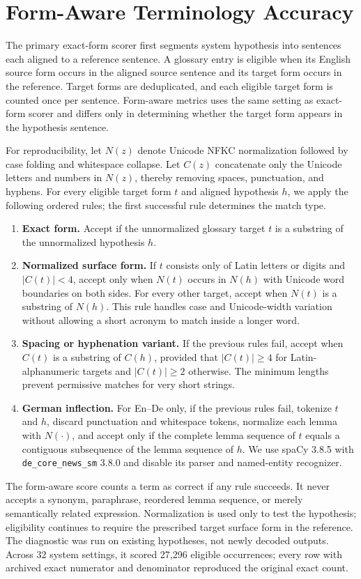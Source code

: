 \section{\texorpdfstring{Form-Aware Terminology Accuracy}{Form-Aware Terminology Accuracy}}
\label{app:form_aware_metric}


The primary exact-form scorer first segments system hypothesis into sentences each aligned to a reference sentence. A glossary entry is eligible when its English source form occurs in the aligned source sentence and its target form occurs in the reference. Target forms are deduplicated, and each eligible target form is counted once per sentence. Form-aware metrics uses the same setting as exact-form scorer and differs only in determining whether the target form appears in the hypothesis sentence.

For reproducibility, let $N(z)$ denote Unicode NFKC normalization followed by case folding and whitespace collapse. Let $C(z)$ concatenate only the Unicode letters and numbers in $N(z)$, thereby removing spaces, punctuation, and hyphens. For every eligible target form $t$ and aligned hypothesis $h$, we apply the following ordered rules; the first successful rule determines the match type.
\begin{enumerate}[leftmargin=*,nosep]
    \item \textbf{Exact form.} Accept if the unnormalized glossary target $t$ is a substring of the unnormalized hypothesis $h$.
    \item \textbf{Normalized surface form.} If $t$ consists only of Latin letters or digits and $|C(t)|<4$, accept only when $N(t)$ occurs in $N(h)$ with Unicode word boundaries on both sides. For every other target, accept when $N(t)$ is a substring of $N(h)$. This rule handles case and Unicode-width variation without allowing a short acronym to match inside a longer word.
    \item \textbf{Spacing or hyphenation variant.} If the previous rules fail, accept when $C(t)$ is a substring of $C(h)$, provided that $|C(t)|\geq4$ for Latin-alphanumeric targets and $|C(t)|\geq2$ otherwise. The minimum lengths prevent permissive matches for very short strings.
    \item \textbf{German inflection.} For En--De only, if the previous rules fail, tokenize $t$ and $h$, discard punctuation and whitespace tokens, normalize each lemma with $N(\cdot)$, and accept only if the complete lemma sequence of $t$ equals a contiguous subsequence of the lemma sequence of $h$. We use spaCy 3.8.5 with \texttt{de\_core\_news\_sm} 3.8.0 and disable its parser and named-entity recognizer.
\end{enumerate}
The form-aware score counts a term as correct if any rule succeeds. It never accepts a synonym, paraphrase, reordered lemma sequence, or merely semantically related expression. Normalization is used only to test the hypothesis; eligibility continues to require the prescribed target surface form in the reference. The diagnostic was run on existing hypotheses, not newly decoded outputs. Across 32 system settings, it scored 27,296 eligible occurrences; every row with archived exact numerator and denominator reproduced the original exact count.



